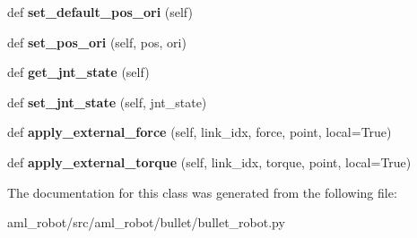 \begin{DoxyCompactItemize}
def {\bfseries set\+\_\+default\+\_\+pos\+\_\+ori} (self)
\item 
\hypertarget{classaml__robot_1_1bullet_1_1bullet__robot_1_1_bullet_robot_a4202949ee81817e457b216684e21e15e}{}\label{classaml__robot_1_1bullet_1_1bullet__robot_1_1_bullet_robot_a4202949ee81817e457b216684e21e15e} 
def {\bfseries set\+\_\+pos\+\_\+ori} (self, pos, ori)
\item 
\hypertarget{classaml__robot_1_1bullet_1_1bullet__robot_1_1_bullet_robot_a3e28f9e668c9445434fb4c9e6392cc51}{}\label{classaml__robot_1_1bullet_1_1bullet__robot_1_1_bullet_robot_a3e28f9e668c9445434fb4c9e6392cc51} 
def {\bfseries get\+\_\+jnt\+\_\+state} (self)
\item 
\hypertarget{classaml__robot_1_1bullet_1_1bullet__robot_1_1_bullet_robot_a09c1f4a3ceb24b3f4f90b4e876340960}{}\label{classaml__robot_1_1bullet_1_1bullet__robot_1_1_bullet_robot_a09c1f4a3ceb24b3f4f90b4e876340960} 
def {\bfseries set\+\_\+jnt\+\_\+state} (self, jnt\+\_\+state)
\item 
\hypertarget{classaml__robot_1_1bullet_1_1bullet__robot_1_1_bullet_robot_a2cfc704576b76cdf947f42b142d946ab}{}\label{classaml__robot_1_1bullet_1_1bullet__robot_1_1_bullet_robot_a2cfc704576b76cdf947f42b142d946ab} 
def {\bfseries apply\+\_\+external\+\_\+force} (self, link\+\_\+idx, force, point, local=True)
\item 
\hypertarget{classaml__robot_1_1bullet_1_1bullet__robot_1_1_bullet_robot_a25423a0653e788681c928765db5bdc81}{}\label{classaml__robot_1_1bullet_1_1bullet__robot_1_1_bullet_robot_a25423a0653e788681c928765db5bdc81} 
def {\bfseries apply\+\_\+external\+\_\+torque} (self, link\+\_\+idx, torque, point, local=True)
\end{DoxyCompactItemize}


The documentation for this class was generated from the following file\+:\begin{DoxyCompactItemize}
\item 
aml\+\_\+robot/src/aml\+\_\+robot/bullet/bullet\+\_\+robot.\+py\end{DoxyCompactItemize}
